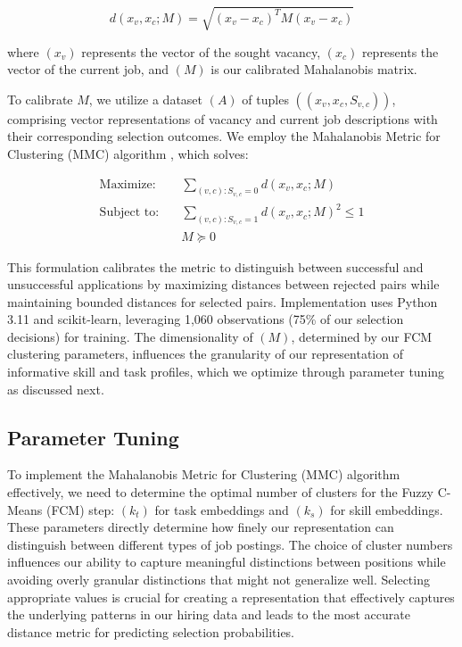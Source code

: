 \begin{equation}
d(x_v, x_c; M) = \sqrt{(x_v - x_c)^T M (x_v - x_c)}
\end{equation}

where $(x_v)$ represents the vector of the sought vacancy, $(x_c)$ represents the vector of the current job, 
and $(M)$ is our calibrated Mahalanobis matrix.

To calibrate $M$, we utilize a dataset $(A)$ of tuples $((x_v, x_c, S_{v,c}))$, comprising vector representations 
of vacancy and current job descriptions with their corresponding selection outcomes. We employ the Mahalanobis 
Metric for Clustering (MMC) algorithm \citep{Xing2002}, which solves:

\begin{align*}
\text{Maximize:} \quad & \sum_{(v,c): S_{v,c} = 0} d(x_v, x_c; M) \\[1em]
\text{Subject to:} \quad & \sum_{(v,c): S_{v,c} = 1} d(x_v, x_c; M)^2 \leq 1 \\
& M \succeq 0
\end{align*}

This formulation calibrates the metric to distinguish between successful and unsuccessful applications by 
maximizing distances between rejected pairs while maintaining bounded distances for selected pairs. Implementation 
uses Python 3.11 and scikit-learn, leveraging 1,060 observations (75\% of our selection decisions) for training. 
The dimensionality of $(M)$, determined by our FCM clustering parameters, influences the granularity of our 
representation of informative skill and task profiles, which we optimize through parameter tuning as discussed next.


\subsection{Parameter Tuning}

To implement the Mahalanobis Metric for Clustering (MMC) algorithm effectively, we need to determine the
optimal number of clusters for the Fuzzy C-Means (FCM) step: $(k_t)$ for task embeddings and $(k_s)$ for skill
embeddings. These parameters directly determine how finely our representation can distinguish between
different types of job postings. The choice of cluster numbers influences our ability to capture meaningful
distinctions between positions while avoiding overly granular distinctions that might not generalize well.
Selecting appropriate values is crucial for creating a representation that effectively captures the
underlying patterns in our hiring data and leads to the most accurate distance metric for predicting
selection probabilities.

